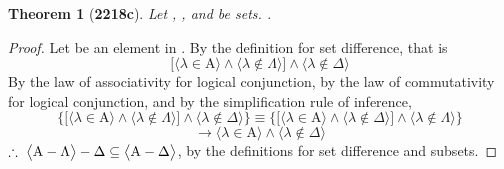 \documentclass[preview]{standalone}
\newtheorem{theorem}{Theorem}
\begin{document}
\begin{theorem}[\textbf{2218c}]
    Let , \bm{$\Lambda$}, and \bm{$\Delta$} be sets. 
    .
\end{theorem}
\begin{proof}
    Let \bm{$\lambda$} be an element in 
    . 
    By the definition for set difference, that is
    \begin{equation*}
        \bigg[
            \Big \langle \lambda \in \mathrm{A} \Big \rangle
                \land
            \Big \langle \lambda \notin \Lambda \Big \rangle
        \bigg]
            \land
        \Big \langle \lambda \notin \Delta \Big \rangle
    \end{equation*}
    By the law of associativity for logical conjunction, 
    by the law of commutativity for logical conjunction,
    and by the simplification rule of inference,
    \begin{equation*}
        \Bigg\{
            \bigg[
                \Big \langle \lambda \in \mathrm{A} \Big \rangle
                    \land
                \Big \langle \lambda \notin \Lambda \Big \rangle
            \bigg]
                \land
            \Big \langle \lambda \notin \Delta \Big \rangle
        \Bigg\}
            \equiv
        \Bigg\{
            \bigg[
                \Big \langle \lambda \in \mathrm{A} \Big \rangle
                    \land
                \Big \langle \lambda \notin \Delta \Big \rangle
            \bigg]
                \land
            \Big \langle \lambda \notin \Lambda \Big \rangle
        \Bigg\}
    \end{equation*}
    \begin{equation*}
            \to
        \Big \langle \lambda \in \mathrm{A} \Big \rangle
            \land
        \Big \langle \lambda \notin \Delta \Big \rangle
    \end{equation*}
    $\therefore \text{\space} \relax{
    \big \langle \mathrm{A} - \Lambda \big \rangle - \Delta 
        \subseteq 
    \big \langle \mathrm{A} - \Delta \big \rangle
    }$,
    by the definitions for set difference and subsets.
\end{proof}
\end{document}
